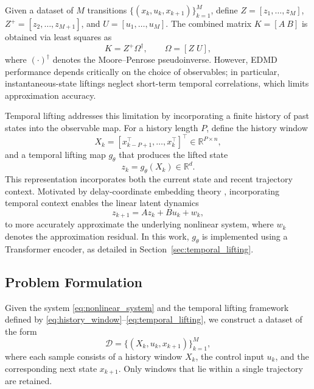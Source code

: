 \documentclass[journal]{IEEEtran}
\begin{document}
Given a dataset of $M$ transitions $\{(x_k, u_k, x_{k+1})\}_{k=1}^M$, define $Z = [z_1,\ldots,z_M]$, $Z^+ = [z_2,\ldots,z_{M+1}]$, and $U = [u_1,\ldots,u_M]$. The combined matrix $K = [A\ B]$ is obtained via least squares as
\begin{equation}
    K = Z^+ \Omega^\dagger, \qquad \Omega = [Z\; U],
    \label{eq:edmd_regression}
\end{equation}
where $(\cdot)^\dagger$ denotes the Moore--Penrose pseudoinverse. However, EDMD performance depends critically on the choice of observables; in particular, instantaneous-state liftings neglect short-term temporal correlations, which limits approximation accuracy.

Temporal lifting addresses this limitation by incorporating a finite history of past states into the observable map. For a history length $P$, define the history window
\begin{equation}
    X_k = [x_{k-P+1}^\top, \ldots, x_k^\top]^\top \in \mathbb{R}^{P\times n},
    \label{eq:history_window}
\end{equation}
and a temporal lifting map $g_\theta$ that produces the lifted state
\begin{equation}
    z_k = g_\theta(X_k) \in \mathbb{R}^d.
    \label{eq:temporal_lifting}
\end{equation}
This representation incorporates both the current state and recent trajectory context. Motivated by delay-coordinate embedding theory \cite{arbabi2017ergodic, rank2019recurrent}, incorporating temporal context enables the linear latent dynamics
\begin{equation}
    z_{k+1} = A z_k + B u_k + w_k,
    \label{eq:lifted_dynamics_prelim}
\end{equation}
to more accurately approximate the underlying nonlinear system, where $w_k$ denotes the approximation residual. In this work, $g_\theta$ is implemented using a Transformer encoder, as detailed in Section~\ref{sec:temporal_lifting}.

\subsection{Problem Formulation}
\label{sec:problem}

Given the system \eqref{eq:nonlinear_system} and the temporal lifting framework defined by \eqref{eq:history_window}--\eqref{eq:temporal_lifting}, we construct a dataset of the form
\begin{equation}
    \mathcal{D} = \{(X_k, u_k, x_{k+1})\}_{k=1}^{M},
    \label{eq:dataset}
\end{equation}
where each sample consists of a history window $X_k$, the control input $u_k$, and the corresponding next state $x_{k+1}$. Only windows that lie within a single trajectory are retained.
\end{document}
